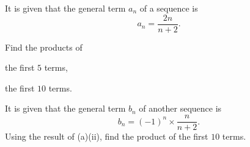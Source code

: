  It is given that the general term $a_n$ of a sequence is
\[
  a_n = \dfrac{2n}{n+2}.
\]
\begin{subparts}
  \item
  Find the products of
  \begin{subpartsii}
    \item the first $5$ terms,
    \item the first $10$ terms.
  \end{subpartsii}


  \item It is given that the general term $b_n$ of another sequence is
  \[
    b_n = (-1)^n \times \dfrac{n}{n+2}.
  \]
  \noindent Using the result of (a)(ii), find the product of the first $10$ terms.
\end{subparts}

